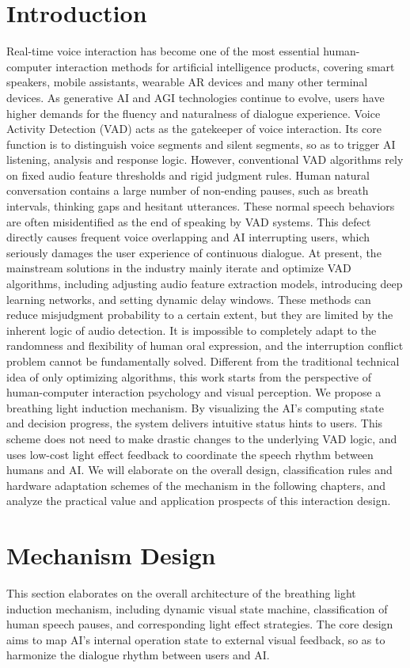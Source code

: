 \documentclass{article}
\begin{document}
\section{Introduction}
Real-time voice interaction has become one of the most essential human-computer
interaction methods for artificial intelligence products, covering smart speakers, mobile
assistants, wearable AR devices and many other terminal devices. As generative AI and AGI
technologies continue to evolve, users have higher demands for the fluency and naturalness
of dialogue experience.
Voice Activity Detection (VAD) acts as the gatekeeper of voice interaction. Its core function is
to distinguish voice segments and silent segments, so as to trigger AI listening, analysis and
response logic. However, conventional VAD algorithms rely on fixed audio feature thresholds
and rigid judgment rules. Human natural conversation contains a large number of
non-ending pauses, such as breath intervals, thinking gaps and hesitant utterances. These
normal speech behaviors are often misidentified as the end of speaking by VAD systems.
This defect directly causes frequent voice overlapping and AI interrupting users, which
seriously damages the user experience of continuous dialogue.
At present, the mainstream solutions in the industry mainly iterate and optimize VAD
algorithms, including adjusting audio feature extraction models, introducing deep learning
networks, and setting dynamic delay windows. These methods can reduce misjudgment
probability to a certain extent, but they are limited by the inherent logic of audio detection. It
is impossible to completely adapt to the randomness and flexibility of human oral expression,
and the interruption conflict problem cannot be fundamentally solved.
Different from the traditional technical idea of only optimizing algorithms, this work starts
from the perspective of human-computer interaction psychology and visual perception. We
propose a breathing light induction mechanism. By visualizing the AI's computing state and
decision progress, the system delivers intuitive status hints to users. This scheme does not
need to make drastic changes to the underlying VAD logic, and uses low-cost light effect
feedback to coordinate the speech rhythm between humans and AI. We will elaborate on the
overall design, classification rules and hardware adaptation schemes of the mechanism in
the following chapters, and analyze the practical value and application prospects of this
interaction design.
\section{Mechanism Design}
This section elaborates on the overall architecture of the breathing light induction
mechanism, including dynamic visual state machine, classification of human speech pauses,
and corresponding light effect strategies. The core design aims to map AI’s internal
operation state to external visual feedback, so as to harmonize the dialogue rhythm between
users and AI.
\end{document}
